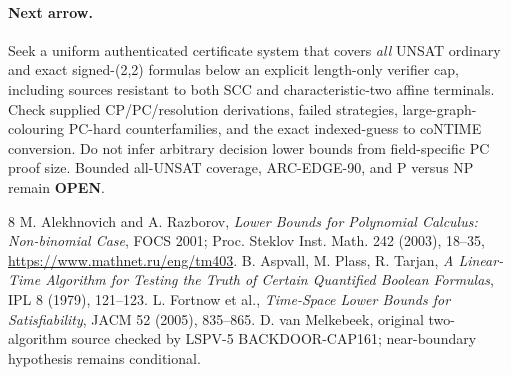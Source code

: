 \documentclass[11pt]{article}
\begin{document}
\paragraph{Next arrow.}
Seek a uniform authenticated certificate system that covers \emph{all} UNSAT ordinary and exact signed-(2,2) formulas below an explicit length-only verifier cap, including sources resistant to both SCC and characteristic-two affine terminals. Check supplied CP/PC/resolution derivations, failed strategies, large-graph-colouring PC-hard counterfamilies, and the exact indexed-guess to coNTIME conversion. Do not infer arbitrary decision lower bounds from field-specific PC proof size. Bounded all-UNSAT coverage, ARC-EDGE-90, and P versus NP remain \textbf{OPEN}.
\begin{thebibliography}{8}
 M. Alekhnovich and A. Razborov, \emph{Lower Bounds for Polynomial Calculus: Non-binomial Case}, FOCS 2001; Proc. Steklov Inst. Math. 242 (2003), 18--35, \url{https://www.mathnet.ru/eng/tm403}.
 B. Aspvall, M. Plass, R. Tarjan, \emph{A Linear-Time Algorithm for Testing the Truth of Certain Quantified Boolean Formulas}, IPL 8 (1979), 121--123.
 L. Fortnow et al., \emph{Time-Space Lower Bounds for Satisfiability}, JACM 52 (2005), 835--865.
 D. van Melkebeek, original two-algorithm source checked by LSPV-5 BACKDOOR-CAP161; near-boundary hypothesis remains conditional.
\end{thebibliography}
\end{document}
